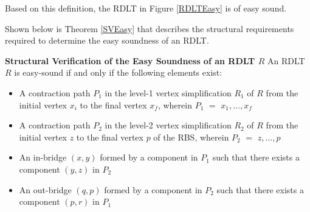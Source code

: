 Based on this definition, the RDLT in Figure \ref{RDLTEasy} is of easy sound.

Shown below is Theorem \ref{SVEasy} that describes the structural requirements required to determine the easy soundness of an RDLT.

\begin{thm}\textbf{Structural Verification of the Easy Soundness of an RDLT $ R $}
    \cite{Ramirez2024}
    \label{SVEasy}
    An RDLT $ R $ is easy-sound if and only if the following elements exist: 
    \begin{itemize}
        \item A contraction path $ P_1 $ in the level-1 vertex simplification $ R_1 $ of $ R $ from the initial vertex $ x_i $ to the final vertex $ x_f $, wherein $ P_1 $ $ = $ $ x_1, \ldots, x_f $
        \item A contraction path $ P_2 $ in the level-2 vertex simplification $ R_2 $ of $ R $ from the initial vertex $ z $ to the final vertex $ p $ of the RBS, wherein $ P_2 $ $ = $ $ z, \ldots, p $
        \item An in-bridge $ (x,y) $ formed by a component in $ P_1 $ such that there exists a component $ (y,z) $ in $ P_2 $
        \item An out-bridge $ (q,p) $ formed by a component in $ P_2 $ such that there exists a component $ (p,r) $ in $ P_1 $
    \end{itemize}
\end{thm}


